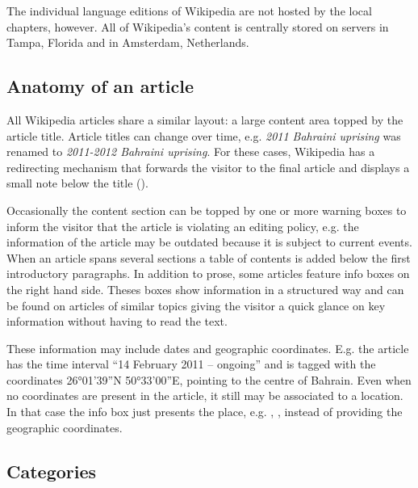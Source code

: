 The individual language editions of Wikipedia are not hosted by the local chapters, however.
All of Wikipedia's content is centrally stored on servers in Tampa, Florida and in Amsterdam, Netherlands.\cite{wmf}

\subsection{Anatomy of an article}\label{sub:article}

All Wikipedia articles share a similar layout: a large content area topped by the article title.
Article titles can change over time, e.g. \emph{2011 Bahraini uprising} was renamed to \emph{2011-2012 Bahraini uprising}. 
For these cases, Wikipedia has a redirecting mechanism that forwards the visitor to the final article and displays a small note below the title ().


Occasionally the content section can be topped by one or more warning boxes to inform the visitor that the article is violating an editing policy, e.g. the information of the article may be outdated because it is subject to current events.
When an article spans several sections a table of contents is added below the first introductory paragraphs.
In addition to prose, some articles feature info boxes on the right hand side.
Theses boxes show information in a structured way and can be found on articles of similar topics giving the visitor a quick glance on key information without having to read the text.

These information may include dates and geographic coordinates.
E.g. the article  has the time interval ``14 February 2011 – ongoing'' and is tagged with the coordinates 26°01'39''N 50°33'00''E, pointing to the centre of Bahrain.
Even when no coordinates are present in the article, it still may be associated to a location.
In that case the info box just presents the place, e.g. , , instead of providing the geographic coordinates. 

\subsection{Categories}\label{sub:categories}

